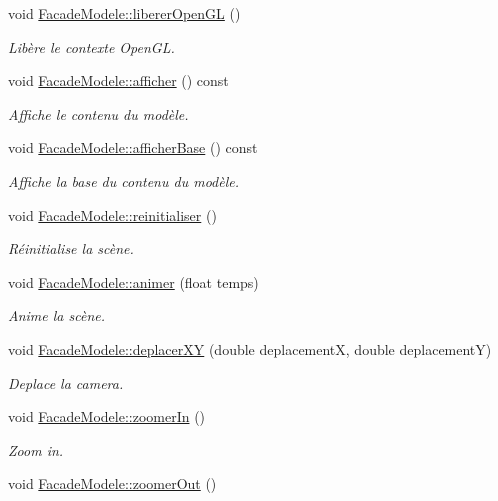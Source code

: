 \begin{DoxyCompactItemize}
void \hyperlink{group__inf2990_gac7b831ce13626514e9637c4533d7c15d}{Facade\-Modele\-::liberer\-Open\-G\-L} ()
\begin{DoxyCompactList}\small\item\em Libère le contexte Open\-G\-L. \end{DoxyCompactList}\item 
void \hyperlink{group__inf2990_gac884e818dab5fe049a37b3f6f1c5d8c6}{Facade\-Modele\-::afficher} () const 
\begin{DoxyCompactList}\small\item\em Affiche le contenu du modèle. \end{DoxyCompactList}\item 
void \hyperlink{group__inf2990_ga23bed5e3b226e446cfee30084150f7f7}{Facade\-Modele\-::afficher\-Base} () const 
\begin{DoxyCompactList}\small\item\em Affiche la base du contenu du modèle. \end{DoxyCompactList}\item 
void \hyperlink{group__inf2990_ga4c2a991fe2297e44eeee0de111fb08d2}{Facade\-Modele\-::reinitialiser} ()
\begin{DoxyCompactList}\small\item\em Réinitialise la scène. \end{DoxyCompactList}\item 
void \hyperlink{group__inf2990_ga24dcb4e32cf104797158b398bafbfbb7}{Facade\-Modele\-::animer} (float temps)
\begin{DoxyCompactList}\small\item\em Anime la scène. \end{DoxyCompactList}\item 
void \hyperlink{group__inf2990_ga1d0468d14d18990c39861b22d4921a7c}{Facade\-Modele\-::deplacer\-X\-Y} (double deplacement\-X, double deplacement\-Y)
\begin{DoxyCompactList}\small\item\em Deplace la camera. \end{DoxyCompactList}\item 
void \hyperlink{group__inf2990_ga8f027fa8ccba48bada7b91b1bc32ed96}{Facade\-Modele\-::zoomer\-In} ()
\begin{DoxyCompactList}\small\item\em Zoom in. \end{DoxyCompactList}\item 
void \hyperlink{group__inf2990_gaa2e1aeaa2fd10b16cf8b5f406d6270c8}{Facade\-Modele\-::zoomer\-Out} ()

\end{DoxyCompactItemize}

